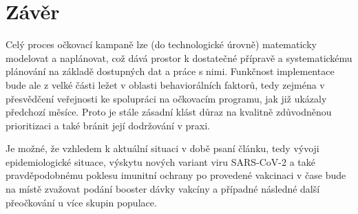 \section*{Závěr}

Celý proces očkovací kampaně lze (do technologické úrovně) matematicky modelovat a naplánovat, což  dává prostor k dostatečné přípravě a systematickému plánování na základě dostupných dat a práce s nimi. Funkčnost implementace bude ale z velké části ležet v oblasti behaviorálních faktorů, tedy zejména v přesvědčení veřejnosti ke spolupráci na očkovacím programu, jak již ukázaly předchozí měsíce. 
%
Proto je stále zásadní klást důraz na kvalitně zdůvodněnou prioritizaci a také bránit její dodržování v praxi. %

Je možné, že vzhledem k aktuální situaci v době psaní článku, tedy vývoji epidemiologické situace, výskytu nových variant viru SARS-CoV-2 a také pravděpodobnému poklesu imunitní ochrany po provedené vakcinaci v čase bude na místě zvažovat podání booster dávky vakcíny a případné následné další přeočkování u více skupin populace. %

